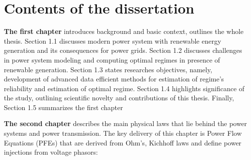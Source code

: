 \section*{Contents of the dissertation}

\textbf{The first chapter} introduces background and basic context, outlines the whole thesis. Section 1.1 discusses modern power system with renewable energy generation and its consequences for power grids. Section 1.2 discusses challenges in power system modeling and computing optimal regimes in presence of renewable generation. Section 1.3 states researches objectives, namely, development of advanced data efficient methods for estimation of regime's reliability and estimation of optimal regime. Section 1.4 highlights significance of the study, outlining scientific novelty and contributions of this thesis. Finally, Section 1.5 summarizes the first chapter

\textbf{The second chapter} describes the main physical laws that lie behind the power systems and power transmission. The key delivery of this chapter is Power Flow Equations (PFEs) that are derived from Ohm's, Kichhoff laws and define power injections from voltage phasors:


